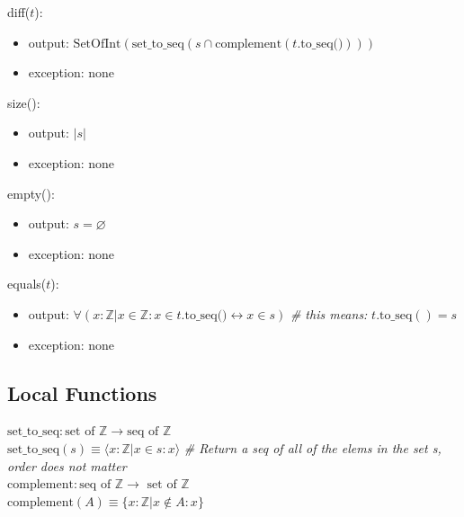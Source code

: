 \documentclass[12pt,fleqn]{examtst}
\begin{document}
\noindent diff($t$):
\begin{itemize}
\item output:
  $\text{SetOfInt}( \text{set\_to\_seq} (s \cap \text{complement}(t.\text{to\_seq()})))$
  
\item exception: none
\end{itemize}

\noindent size():
\begin{itemize}
\item output: $| s |$
\item exception: none
\end{itemize}

\noindent empty():
\begin{itemize}
\item output: $s = \varnothing$
\item exception: none
\end{itemize}

\noindent equals($t$):
\begin{itemize}
\item output: $\forall ( x: \mathbb{Z} | x \in \mathbb{Z} : x \in
  t.\text{to\_seq()} \leftrightarrow x \in s)$ \textit{\# this means:} $t.\text{to\_seq}() = s$
\item exception: none
\end{itemize}

\subsection*{Local Functions}

\noindent $\mbox{set\_to\_seq}: \text{set of } \mathbb{Z} \rightarrow \mbox{seq of }
\mathbb{Z}$\\
\noindent
$\mbox{set\_to\_seq}(s) \equiv \langle x: \mathbb{Z} | x \in s : x \rangle$
\textit{\# Return a seq of all of the elems in the set s, order does not matter}\\

\noindent $\mbox{complement}: \text{seq of } \mathbb{Z} \rightarrow \mbox{ set of }
\mathbb{Z}$\\
$\mbox{complement}(A) \equiv \{ x: \mathbb{Z} | x \not\in A : x \}$\\


\newpage
\end{document}
